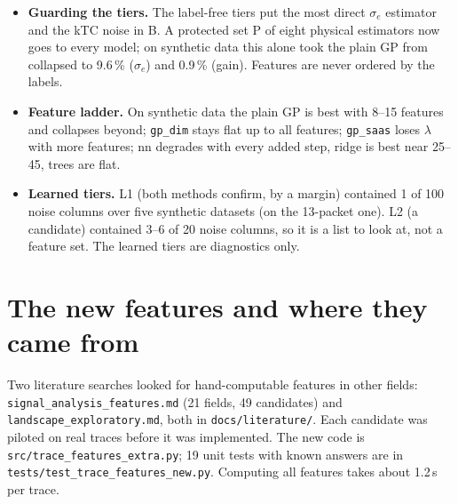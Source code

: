 \documentclass[10pt]{article}
\newcommand{\code}[1]{\texttt{#1}}
\newcommand{\se}{\sigma_e}
\begin{document}
\begin{itemize}
        The plain GP gets P only; trees can take everything.
  \item \textbf{Guarding the tiers.} The label-free tiers put the most direct $\se$ estimator and the kTC noise in B. A
        protected set P of eight physical estimators now goes to every model; on synthetic data this alone took the
        plain GP from collapsed to 9.6\,\% ($\se$) and 0.9\,\% (gain). Features are never ordered by the labels.
  \item \textbf{Feature ladder.} On synthetic data the plain GP is best with 8--15 features and collapses beyond;
        \code{gp\_dim} stays flat up to all features; \code{gp\_saas} loses $\lambda$ with more features; nn degrades with
        every added step, ridge is best near 25--45, trees are flat.
  \item \textbf{Learned tiers.} L1 (both methods confirm, by a margin) contained 1 of 100 noise columns over five
        synthetic datasets (on the 13-packet one). L2 (a candidate) contained 3--6 of 20 noise columns, so it is a list
        to look at, not a feature set. The learned tiers are diagnostics only.
\end{itemize}

\section{The new features and where they came from}
\label{sec:features}

Two literature searches looked for hand-computable features in other fields: \code{signal\_analysis\_features.md}
(21 fields, 49 candidates) and \code{landscape\_exploratory.md}, both in \code{docs/literature/}. Each candidate was piloted on real traces
before it was implemented. The new code is \code{src/trace\_features\_extra.py}; 19 unit tests with known answers are in
\code{tests/test\_trace\_features\_new.py}. Computing all features takes about 1.2\,s per trace.
\end{document}
